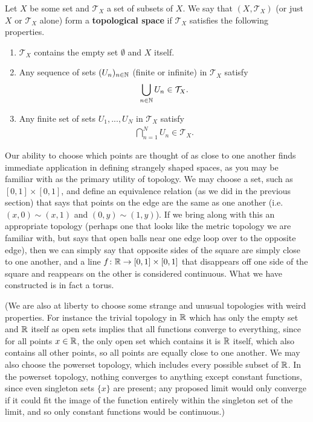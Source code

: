 \documentclass[11pt]{article}
\begin{document}
\begin{definition}
Let $X$ be some set and $\mathcal{T}_X$ a set of subsets of $X$. We say that $(X,\mathcal{T}_X)$ (or just $X$ or $\mathcal{T}_X$ alone) form a \textbf{topological space} if $\mathcal{T}_X$ satisfies the following properties. \begin{enumerate}
\item $\mathcal{T}_X$ contains the empty set $\emptyset$ and $X$ itself.
\item Any sequence of sets $(U_n)_{n \in \mathbb{N}}$ (finite or infinite) in $\mathcal{T}_X$ satisfy \begin{gather*}
\bigcup_{n \in \mathbb{N}} U_n \in \mathcal{T}_X.
\end{gather*}
\item Any finite set of sets $U_1, ..., U_N$ in $\mathcal{T}_X$ satisfy \begin{gather*}
\bigcap_{n =1}^{N} U_n \in \mathcal{T}_X.
\end{gather*}
\end{enumerate}
\end{definition}

Our ability to choose which points are thought of as close to one another finds immediate application in defining strangely shaped spaces, as you may be familiar with as the primary utility of topology. We may choose a set, such as $[0,1] \times [0,1]$, and define an equivalence relation (as we did in the previous section) that says that points on the edge are the same as one another (i.e. $(x,0) \sim (x,1)$ and $(0,y) \sim (1,y)$). If we bring along with this an appropriate topology (perhaps one that looks like the metric topology we are familiar with, but says that open balls near one edge loop over to the opposite edge), then we can simply say that opposite sides of the square are simply close to one another, and a line $f \colon \mathbb{R} \to [0,1] \times [0,1]$ that disappears off one side of the square and reappears on the other is considered continuous. What we have constructed is in fact a torus.

(We are also at liberty to choose some strange and unusual topologies with weird properties. For instance the trivial topology in $\mathbb{R}$ which has only the empty set and $\mathbb{R}$ itself as open sets implies that all functions converge to everything, since for all points $x \in \mathbb{R}$, the only open set which contains it is $\mathbb{R}$ itself, which also contains all other points, so all points are equally close to one another. We may also choose the powerset topology, which includes every possible subset of $\mathbb{R}$. In the powerset topology, nothing converges to anything except constant functions, since even singleton sets $\{x\}$ are present; any proposed limit would only converge if it could fit the image of the function entirely within the singleton set of the limit, and so only constant functions would be continuous.)
\end{document}
